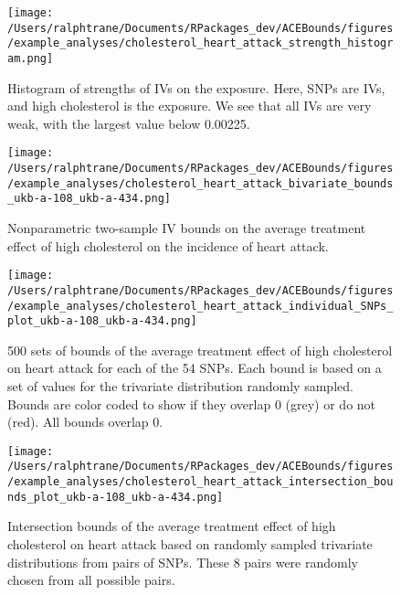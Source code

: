 \documentclass[
]{article}
\theoremstyle{plain}
\begin{document}
\begin{figure}[H]
 \center
 \texttt{[image: /Users/ralphtrane/Documents/RPackages\_dev/ACEBounds/figures/example\_analyses/cholesterol\_heart\_attack\_strength\_histogram.png]}
 \caption{Histogram of strengths of IVs on the exposure. Here, SNPs are IVs, and high cholesterol is the exposure. We see that all IVs are very weak, with the largest value below 0.00225.}
 \label{fig:cholesterol_heart_attack_strength_histogram}
\end{figure}

\begin{figure}[H]
  \texttt{[image: /Users/ralphtrane/Documents/RPackages\_dev/ACEBounds/figures/example\_analyses/cholesterol\_heart\_attack\_bivariate\_bounds\_ukb-a-108\_ukb-a-434.png]}
  \caption{Nonparametric two-sample IV bounds on the average treatment effect of high cholesterol on the incidence of heart attack.}
  \label{fig:cholesterol_on_heart_attack_ind_bounds}
\end{figure}

\clearpage

\begin{sidewaysfigure}
  \center
  \texttt{[image: /Users/ralphtrane/Documents/RPackages\_dev/ACEBounds/figures/example\_analyses/cholesterol\_heart\_attack\_individual\_SNPs\_plot\_ukb-a-108\_ukb-a-434.png]}
    \caption{500 sets of bounds of the average treatment effect of high cholesterol on heart attack for each of the 54 SNPs. Each bound is based on a set of values for the trivariate distribution randomly sampled. Bounds are color coded to show if they overlap 0 (grey) or do not (red). All bounds overlap 0.}
    \label{fig:cholesterol_heart_attack_tri_bounds_all}
\end{sidewaysfigure}

\clearpage

\begin{figure}[H]
  \center
  \texttt{[image: /Users/ralphtrane/Documents/RPackages\_dev/ACEBounds/figures/example\_analyses/cholesterol\_heart\_attack\_intersection\_bounds\_plot\_ukb-a-108\_ukb-a-434.png]}
  \caption{Intersection bounds of the average treatment effect of high cholesterol on heart attack based on randomly sampled trivariate distributions from pairs of SNPs. These 8 pairs were randomly chosen from all possible pairs.}
  \label{fig:cholesterol_on_heart_attack_intersections}
\end{figure}

\printbibliography[title=References]
\end{document}
